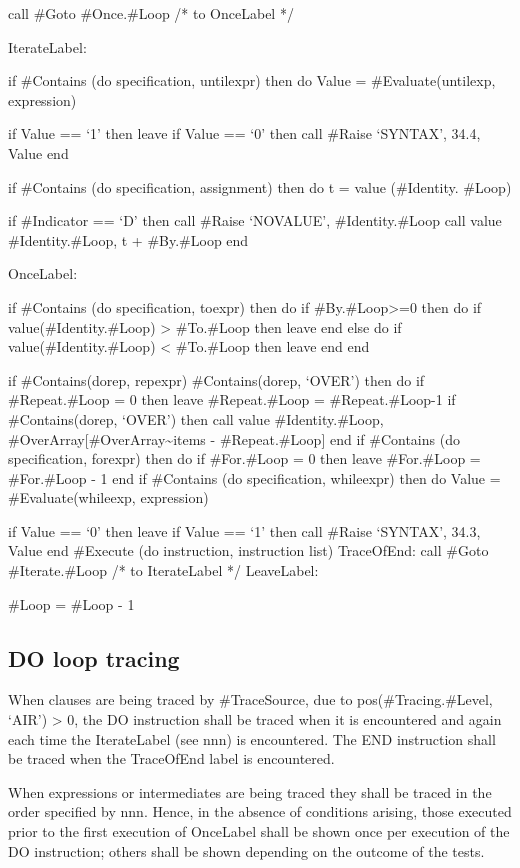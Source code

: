 call \#Goto \#Once.\#Loop /* to OnceLabel */

IterateLabel:

if \#Contains (do specification, untilexpr) then do Value =
\#Evaluate(untilexp, expression)

if Value == `1' then leave if Value == `0' then call \#Raise `SYNTAX',
34.4, Value end

if \#Contains (do specification, assignment) then do t = value
(\#Identity. \#Loop)

if \#Indicator == `D' then call \#Raise `NOVALUE', \#Identity.\#Loop
call value \#Identity.\#Loop, t + \#By.\#Loop end

OnceLabel:

if \#Contains (do specification, toexpr) then do if
\#By.\#Loop\textgreater=0 then do if value(\#Identity.\#Loop)
\textgreater{} \#To.\#Loop then leave end else do if
value(\#Identity.\#Loop) \textless{} \#To.\#Loop then leave end end

if \#Contains(dorep, repexpr) \textbar{} \#Contains(dorep, `OVER') then
do if \#Repeat.\#Loop = 0 then leave \#Repeat.\#Loop = \#Repeat.\#Loop-1
if \#Contains(dorep, `OVER') then call value \#Identity.\#Loop,
\#OverArray{[}\#OverArray\textasciitilde items - \#Repeat.\#Loop{]} end
if \#Contains (do specification, forexpr) then do if \#For.\#Loop = 0
then leave \#For.\#Loop = \#For.\#Loop - 1 end if \#Contains (do
specification, whileexpr) then do Value = \#Evaluate(whileexp,
expression)

if Value == `0' then leave if Value == `1' then call \#Raise `SYNTAX',
34.3, Value end \#Execute (do instruction, instruction list) TraceOfEnd:
call \#Goto \#Iterate.\#Loop /* to IterateLabel */ LeaveLabel:

\#Loop = \#Loop - 1

\subsection{DO loop tracing}\label{do-loop-tracing}

When clauses are being traced by \#TraceSource, due to
pos(\#Tracing.\#Level, `AIR') \textgreater{} 0, the DO instruction shall
be traced when it is encountered and again each time the IterateLabel
(see nnn) is encountered. The END instruction shall be traced when the
TraceOfEnd label is encountered.

When expressions or intermediates are being traced they shall be traced
in the order specified by nnn. Hence, in the absence of conditions
arising, those executed prior to the first execution of OnceLabel shall
be shown once per execution of the DO instruction; others shall be shown
depending on the outcome of the tests.

